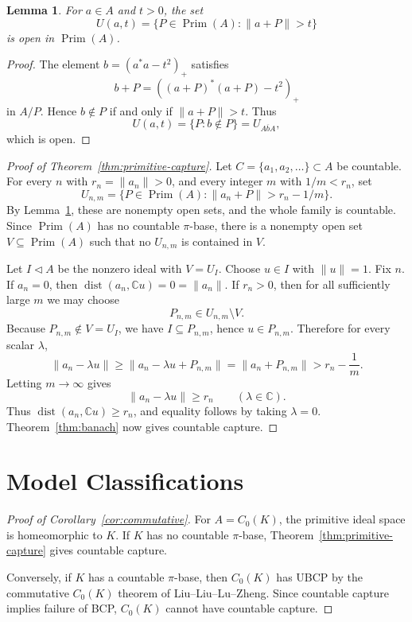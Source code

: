 \documentclass[11pt]{article}
\newtheorem{lemma}{Lemma}
\newcommand{\C}{\mathbb C}
\newcommand{\Prim}{\operatorname{Prim}}
\newcommand{\dist}{\operatorname{dist}}
\begin{document}
\begin{lemma}
\label{lem:near-norm-open}
For \(a\in A\) and \(t>0\), the set
\[
        U(a,t)=\{P\in\Prim(A):\|a+P\|>t\}
\]
is open in \(\Prim(A)\).
\end{lemma}

\begin{proof}
The element \(b=(a^*a-t^2)_+\) satisfies
\[
        b+P=((a+P)^*(a+P)-t^2)_+
\]
in \(A/P\).  Hence \(b\notin P\) if and only if \(\|a+P\|>t\).  Thus
\[
        U(a,t)=\{P:b\notin P\}=U_{\overline{AbA}},
\]
which is open.
\end{proof}

\begin{proof}[Proof of Theorem~\ref{thm:primitive-capture}]
Let \(C=\{a_1,a_2,\ldots\}\subset A\) be countable.  For every \(n\) with
\(r_n=\|a_n\|>0\), and every integer \(m\) with \(1/m<r_n\), set
\[
        U_{n,m}
        =
        \{P\in\Prim(A):\|a_n+P\|>r_n-1/m\}.
\]
By Lemma~\ref{lem:near-norm-open}, these are nonempty open sets, and the
whole family is countable.  Since \(\Prim(A)\) has no countable \(\pi\)-base,
there is a nonempty open set \(V\subseteq\Prim(A)\) such that no \(U_{n,m}\)
is contained in \(V\).

Let \(I\triangleleft A\) be the nonzero ideal with \(V=U_I\).  Choose
\(u\in I\) with \(\|u\|=1\).  Fix \(n\).  If \(a_n=0\), then
\(\dist(a_n,\C u)=0=\|a_n\|\).  If \(r_n>0\), then for all sufficiently large
\(m\) we may choose
\[
        P_{n,m}\in U_{n,m}\setminus V.
\]
Because \(P_{n,m}\notin V=U_I\), we have \(I\subseteq P_{n,m}\), hence
\(u\in P_{n,m}\).  Therefore for every scalar \(\lambda\),
\[
        \|a_n-\lambda u\|
        \ge
        \|a_n-\lambda u+P_{n,m}\|
        =
        \|a_n+P_{n,m}\|
        >
        r_n-\frac1m.
\]
Letting \(m\to\infty\) gives
\[
        \|a_n-\lambda u\|\ge r_n
        \qquad(\lambda\in\C).
\]
Thus \(\dist(a_n,\C u)\ge r_n\), and equality follows by taking
\(\lambda=0\).  Theorem~\ref{thm:banach} now gives countable capture.
\end{proof}

\section*{Model Classifications}

\begin{proof}[Proof of Corollary~\ref{cor:commutative}]
For \(A=C_0(K)\), the primitive ideal space is homeomorphic to \(K\).  If
\(K\) has no countable \(\pi\)-base, Theorem~\ref{thm:primitive-capture}
gives countable capture.

Conversely, if \(K\) has a countable \(\pi\)-base, then \(C_0(K)\) has UBCP
by the commutative \(C_0(K)\) theorem of Liu--Liu--Lu--Zheng.  Since
countable capture implies failure of BCP, \(C_0(K)\) cannot have countable
capture.
\end{proof}
\end{document}
